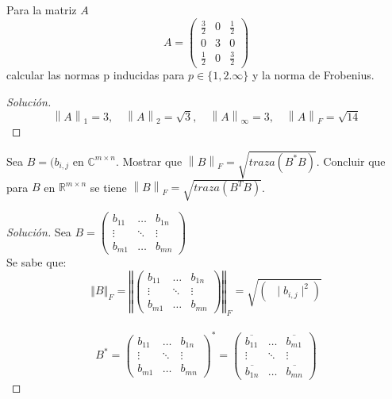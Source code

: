 \documentclass[12pt]{book}
\newcommand{\C}{\mathbb{C}}
\newcommand{\R}{\mathbb{R}}
\newcommand\norm[1]{\left\lVert#1\right\rVert}
\newenvironment{solucion}
  {\renewcommand\qedsymbol{$\square$}\begin{proof}[Solución]}
  {\end{proof}}
\begin{document}
\eje Para la matriz $A$
\[
    A=\begin{pmatrix}
        \frac{3}{2}&0&\frac{1}{2}\\
        0&3&0\\
        \frac{1}{2}&0&\frac{3}{2}
    \end{pmatrix}
\]
calcular las normas p inducidas para $p\in\{1,2.\infty\}$ y la norma de Frobenius.

\begin{solucion}
\[
    \norm{A}_1=3,\quad \norm{A}_2=\sqrt{3},\quad \norm{A}_\infty=3,\quad \norm{A}_F=\sqrt{14}
\]
\end{solucion}

\eje Sea $B=(b_{i,j}$ en $\C^{m\times n}$. Mostrar que $\norm{B}_F=\sqrt{traza(B^*B)}$. Concluir que para $B$ en $\R^{m\times n}$ se tiene $\norm{B}_F=\sqrt{traza(B^TB)}$.
\begin{solucion}
Sea $B=\begin{pmatrix}
b_{11} & \dots & b_{1n}\\
\vdots & \ddots & \vdots\\
b_{m1} & \dots & b_{mn}
\end{pmatrix}$\\
Se sabe que:
\begin{equation*}
    \left\Vert B \right\Vert_F = \left\Vert \begin{pmatrix}
        b_{11} & \dots & b_{1n}\\
        \vdots & \ddots & \vdots\\
        b_{m1} & \dots & b_{mn}
    \end{pmatrix}\right\Vert_F = \sqrt{\left( \mathop{\sum_{i=1}^{m}\sum_{j=1}^{n}} \mid b_{i,j} \mid ^2 \right)}
\end{equation*} \\
\begin{equation*}
    B^* = \begin{pmatrix}
        b_{11} & \dots & b_{1n}\\
        \vdots & \ddots & \vdots\\
        b_{m1} & \dots & b_{mn}
    \end{pmatrix}^\ast= \begin{pmatrix}
        \overline{b_{11}} & \dots & \overline{b_{m1}}\\
        \vdots & \ddots & \vdots\\
        \overline{b_{1n}} & \dots & \overline{b_{mn}}
    \end{pmatrix}
\end{equation*}

\end{solucion}
\end{document}
